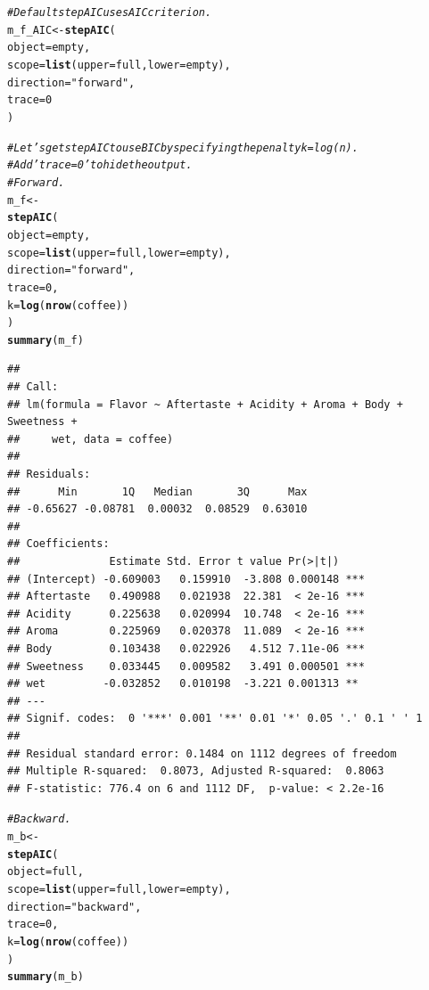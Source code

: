 \documentclass[oneside]{book}\usepackage[]{graphicx}\usepackage[dvipsnames,table,xcdraw]{xcolor}
\makeatletter
\newcommand{\hlnum}[1]{\textcolor[rgb]{0.686,0.059,0.569}{#1}}%
\newcommand{\hlstr}[1]{\textcolor[rgb]{0.192,0.494,0.8}{#1}}%
\newcommand{\hlcom}[1]{\textcolor[rgb]{0.678,0.584,0.686}{\textit{#1}}}%
\newcommand{\hlstd}[1]{\textcolor[rgb]{0.345,0.345,0.345}{#1}}%
\newcommand{\hlkwb}[1]{\textcolor[rgb]{0.69,0.353,0.396}{#1}}%
\newcommand{\hlkwc}[1]{\textcolor[rgb]{0.333,0.667,0.333}{#1}}%
\newcommand{\hlkwd}[1]{\textcolor[rgb]{0.737,0.353,0.396}{\textbf{#1}}}%
\newenvironment{kframe}{%
 \def\at@end@of@kframe{}%
 \ifinner\ifhmode%
  \def\at@end@of@kframe{\end{minipage}}%
  \begin{minipage}{\columnwidth}%
 \fi\fi%
 \def\FrameCommand##1{\hskip\@totalleftmargin \hskip-\fboxsep
 \colorbox{shadecolor}{##1}\hskip-\fboxsep
     \hskip-\linewidth \hskip-\@totalleftmargin \hskip\columnwidth}%
 \MakeFramed {\advance\hsize-\width
   \@totalleftmargin\z@ \linewidth\hsize
   \@setminipage}}%
 {\par\unskip\endMakeFramed%
 \at@end@of@kframe}
\newenvironment{knitrout}{}{} %
\makeatother
\begin{document}
\begin{knitrout}
\begin{kframe}
\begin{alltt}
\hlcom{# Default stepAIC uses AIC criterion.}
\hlstd{m_f_AIC} \hlkwb{<-} \hlkwd{stepAIC}\hlstd{(}
\hlkwc{object} \hlstd{= empty,}
\hlkwc{scope} \hlstd{=} \hlkwd{list}\hlstd{(}\hlkwc{upper} \hlstd{= full,} \hlkwc{lower} \hlstd{= empty),}
\hlkwc{direction} \hlstd{=} \hlstr{"forward"}\hlstd{,}
\hlkwc{trace} \hlstd{=} \hlnum{0}
\hlstd{)}

\hlcom{# Let's get stepAIC to use BIC by specifying the penalty k = log(n).}
\hlcom{# Add 'trace = 0' to hide the output.}
\hlcom{# Forward.}
\hlstd{m_f} \hlkwb{<-}
\hlkwd{stepAIC}\hlstd{(}
\hlkwc{object} \hlstd{= empty,}
\hlkwc{scope} \hlstd{=} \hlkwd{list}\hlstd{(}\hlkwc{upper} \hlstd{= full,} \hlkwc{lower} \hlstd{= empty),}
\hlkwc{direction} \hlstd{=} \hlstr{"forward"}\hlstd{,}
\hlkwc{trace} \hlstd{=} \hlnum{0}\hlstd{,}
\hlkwc{k} \hlstd{=} \hlkwd{log}\hlstd{(}\hlkwd{nrow}\hlstd{(coffee))}
\hlstd{)}
\hlkwd{summary}\hlstd{(m_f)}
\end{alltt}
\begin{verbatim}
## 
## Call:
## lm(formula = Flavor ~ Aftertaste + Acidity + Aroma + Body + Sweetness + 
##     wet, data = coffee)
## 
## Residuals:
##      Min       1Q   Median       3Q      Max 
## -0.65627 -0.08781  0.00032  0.08529  0.63010 
## 
## Coefficients:
##              Estimate Std. Error t value Pr(>|t|)    
## (Intercept) -0.609003   0.159910  -3.808 0.000148 ***
## Aftertaste   0.490988   0.021938  22.381  < 2e-16 ***
## Acidity      0.225638   0.020994  10.748  < 2e-16 ***
## Aroma        0.225969   0.020378  11.089  < 2e-16 ***
## Body         0.103438   0.022926   4.512 7.11e-06 ***
## Sweetness    0.033445   0.009582   3.491 0.000501 ***
## wet         -0.032852   0.010198  -3.221 0.001313 ** 
## ---
## Signif. codes:  0 '***' 0.001 '**' 0.01 '*' 0.05 '.' 0.1 ' ' 1
## 
## Residual standard error: 0.1484 on 1112 degrees of freedom
## Multiple R-squared:  0.8073,	Adjusted R-squared:  0.8063 
## F-statistic: 776.4 on 6 and 1112 DF,  p-value: < 2.2e-16
\end{verbatim}
\begin{alltt}
\hlcom{# Backward.}
\hlstd{m_b} \hlkwb{<-}
\hlkwd{stepAIC}\hlstd{(}
\hlkwc{object} \hlstd{= full,}
\hlkwc{scope} \hlstd{=} \hlkwd{list}\hlstd{(}\hlkwc{upper} \hlstd{= full,} \hlkwc{lower} \hlstd{= empty),}
\hlkwc{direction} \hlstd{=} \hlstr{"backward"}\hlstd{,}
\hlkwc{trace} \hlstd{=} \hlnum{0}\hlstd{,}
\hlkwc{k} \hlstd{=} \hlkwd{log}\hlstd{(}\hlkwd{nrow}\hlstd{(coffee))}
\hlstd{)}
\hlkwd{summary}\hlstd{(m_b)}
\end{alltt}
\begin{verbatim}

\end{verbatim}
\end{kframe}
\end{knitrout}
\end{document}
